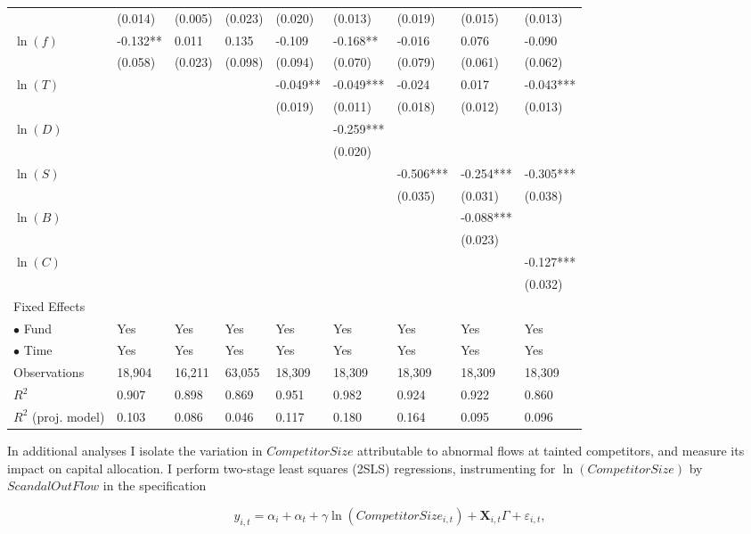 \documentclass[openany]{book}
\theoremstyle{definition}
\theoremstyle{definition}
\theoremstyle{definition}
\theoremstyle{remark}
\begin{document}
\begin{table}[ht]
\begin{tabularx}{0.975\textwidth}{lYYYYYYYY}
   & (0.014) & (0.005) & (0.023) & (0.020) & (0.013) & (0.019) & (0.015) & (0.013) \\ 
  $\ln(f)$ & -0.132** & 0.011 & 0.135 & -0.109 & -0.168** & -0.016 & 0.076 & -0.090 \\ 
   & (0.058) & (0.023) & (0.098) & (0.094) & (0.070) & (0.079) & (0.061) & (0.062) \\ 
  $\ln(T)$ &  &  &  & -0.049** & -0.049*** & -0.024 & 0.017 & -0.043*** \\ 
   &  &  &  & (0.019) & (0.011) & (0.018) & (0.012) & (0.013) \\ 
  $\ln(D)$ &  &  &  &  & -0.259*** &  &  &  \\ 
   &  &  &  &  & (0.020) &  &  &  \\ 
  $\ln(S)$ &  &  &  &  &  & -0.506*** & -0.254*** & -0.305*** \\ 
   &  &  &  &  &  & (0.035) & (0.031) & (0.038) \\ 
  $\ln(B)$ &  &  &  &  &  &  & -0.088*** &  \\ 
   &  &  &  &  &  &  & (0.023) &  \\ 
  $\ln(C)$ &  &  &  &  &  &  &  & -0.127*** \\ 
   &  &  &  &  &  &  &  & (0.032) \\ 
  Fixed Effects &  &  &  &  &  &  &  &  \\ 
  $\bullet$ Fund & Yes & Yes & Yes & Yes & Yes & Yes & Yes & Yes \\ 
  $\bullet$ Time & Yes & Yes & Yes & Yes & Yes & Yes & Yes & Yes \\ 
  Observations & 18,904 & 16,211 & 63,055 & 18,309 & 18,309 & 18,309 & 18,309 & 18,309 \\ 
  $R^2$ & 0.907 & 0.898 & 0.869 & 0.951 & 0.982 & 0.924 & 0.922 & 0.860 \\ 
  $R^2$ (proj. model) & 0.103 & 0.086 & 0.046 & 0.117 & 0.180 & 0.164 & 0.095 & 0.096 \\ 
   \bottomrule
\end{tabularx}
\endgroup
\end{table}

In additional analyses I isolate the variation in \(CompetitorSize\)
attributable to abnormal flows at tainted competitors, and measure its
impact on capital allocation. I perform two-stage least squares (2SLS)
regressions, instrumenting for \(\ln(CompetitorSize)\) by
\(ScandalOutFlow\) in the specification

\begin{equation}
    y_{i,t}=\alpha_i+\alpha_t + \gamma \ln(CompetitorSize_{i,t}) + \mathbf{X}_{i,t}\Gamma+\varepsilon_{i,t},
\end{equation}
\end{document}
